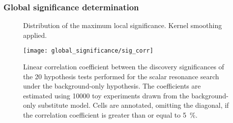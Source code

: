 \subsubsection{Global significance determination}


\begin{figure}[htbp]
  \centering


  \caption{Distribution of the maximum local significance. Kernel smoothing applied.}
  \label{fig:zmax_toys}
\end{figure}

\begin{figure}[htbp]
  \centering

  \texttt{[image: global\_significance/sig\_corr]}

  \caption{Linear correlation coefficient between the discovery
    significances of the 20 hypothesis tests performed for the scalar
    resonance search under the background-only hypothesis. The
    coefficients are estimated using 10000 toy experiments drawn from
    the background-only substitute model. Cells are annotated,
    omitting the diagonal, if the correlation coefficient is greater
    than or equal to \SI{5}{\percent}.}%
  \label{fig:corr_sig}
\end{figure}


